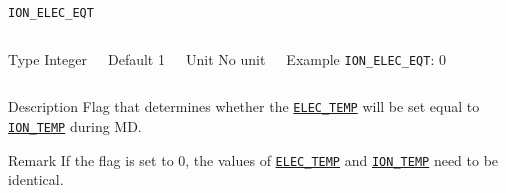 \documentclass[xcolor=dvipsnames,t]{beamer}
\begin{document}
\begin{frame}[allowframebreaks]{\texttt{ION\_ELEC\_EQT}} \label{ION_ELEC_EQT}
\vspace*{-12pt}
\begin{columns}
\begin{block}{Type}
Integer
\end{block}

\begin{block}{Default}
1
\end{block}

\begin{block}{Unit}
No unit
\end{block}

\begin{block}{Example}
\texttt{ION\_ELEC\_EQT}: 0
\end{block}
\end{columns}

\begin{block}{Description}
Flag that determines whether the \hyperlink{ELEC_TEMP}{\texttt{ELEC\_TEMP}} will be set equal to \hyperlink{ION_TEMP}{\texttt{ION\_TEMP}} during MD.
\end{block}

\begin{block}{Remark}
If the flag is set to 0, the values of \hyperlink{ELEC_TEMP}{\texttt{ELEC\_TEMP}} and \hyperlink{ION_TEMP}{\texttt{ION\_TEMP}} need to be identical.  
\end{block}

\end{frame}
\end{document}
